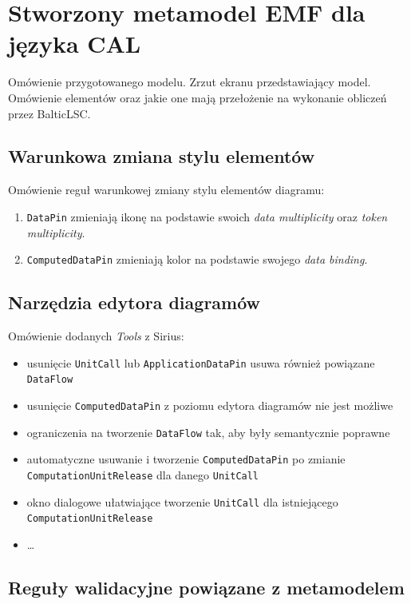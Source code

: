 \section{Stworzony metamodel EMF dla języka CAL}

Omówienie przygotowanego modelu. Zrzut ekranu przedstawiający model. Omówienie
elementów oraz jakie one mają przełożenie na wykonanie obliczeń przez
BalticLSC\@.

\subsection{Warunkowa zmiana stylu elementów}

Omówienie reguł warunkowej zmiany stylu elementów diagramu:

\begin{enumerate}
	\item \texttt{DataPin} zmieniają ikonę na podstawie swoich \textit{data
		      multiplicity} oraz \textit{token multiplicity}.
	\item \texttt{ComputedDataPin} zmieniają kolor na podstawie swojego
	      \textit{data binding}.
\end{enumerate}

\subsection{Narzędzia edytora diagramów}

Omówienie dodanych \textit{Tools} z Sirius:

\begin{itemize}
	\item usunięcie \texttt{UnitCall} lub \texttt{ApplicationDataPin} usuwa również powiązane \texttt{DataFlow}
	\item usunięcie \texttt{ComputedDataPin} z poziomu edytora diagramów nie jest możliwe
	\item ograniczenia na tworzenie \texttt{DataFlow} tak, aby były semantycznie poprawne
	\item automatyczne usuwanie i tworzenie \texttt{ComputedDataPin} po zmianie \texttt{ComputationUnitRelease} dla danego \texttt{UnitCall}
	\item okno dialogowe ułatwiające tworzenie \texttt{UnitCall} dla istniejącego \texttt{ComputationUnitRelease}
	\item \ldots
\end{itemize}

\subsection{Reguły walidacyjne powiązane z
	metamodelem}\label{sec:regulky-walidacyjne-metamodel}

